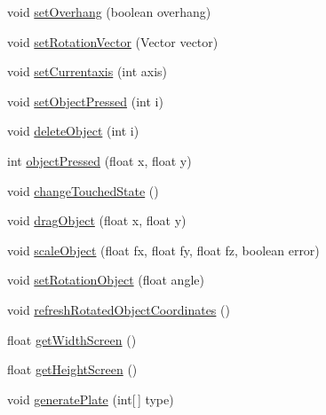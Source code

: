 \begin{DoxyCompactItemize}
void \hyperlink{classandroid_1_1app_1_1printerapp_1_1viewer_1_1_viewer_renderer_a5ac51dcece4fa2df57335da4b1ae89b6}{set\+Overhang} (boolean overhang)
\item 
void \hyperlink{classandroid_1_1app_1_1printerapp_1_1viewer_1_1_viewer_renderer_a630aca5b7a9d108174f4f1dd6afc0d84}{set\+Rotation\+Vector} (Vector vector)
\item 
void \hyperlink{classandroid_1_1app_1_1printerapp_1_1viewer_1_1_viewer_renderer_ae3c686be9606f2c225e9424736db4912}{set\+Currentaxis} (int axis)
\item 
void \hyperlink{classandroid_1_1app_1_1printerapp_1_1viewer_1_1_viewer_renderer_a92a8537b503c5ac2613d68415fca0fc1}{set\+Object\+Pressed} (int i)
\item 
void \hyperlink{classandroid_1_1app_1_1printerapp_1_1viewer_1_1_viewer_renderer_a2c22fea70b90901a3579246fc6b614a1}{delete\+Object} (int i)
\item 
int \hyperlink{classandroid_1_1app_1_1printerapp_1_1viewer_1_1_viewer_renderer_abf337945481fb0c118213fe34bce1c5b}{object\+Pressed} (float x, float y)
\item 
void \hyperlink{classandroid_1_1app_1_1printerapp_1_1viewer_1_1_viewer_renderer_a60fec6c133bbce672995771c925fb7d6}{change\+Touched\+State} ()
\item 
void \hyperlink{classandroid_1_1app_1_1printerapp_1_1viewer_1_1_viewer_renderer_a3ff5d7082c494c9c67509a4f27c10486}{drag\+Object} (float x, float y)
\item 
void \hyperlink{classandroid_1_1app_1_1printerapp_1_1viewer_1_1_viewer_renderer_adffb0db17b4ed757ce7007d436547cb9}{scale\+Object} (float fx, float fy, float fz, boolean error)
\item 
void \hyperlink{classandroid_1_1app_1_1printerapp_1_1viewer_1_1_viewer_renderer_ac323309cf851ac7474f012bf08d775d8}{set\+Rotation\+Object} (float angle)
\item 
void \hyperlink{classandroid_1_1app_1_1printerapp_1_1viewer_1_1_viewer_renderer_a4ffd3487ece07adfed6d1d3a8ea10c01}{refresh\+Rotated\+Object\+Coordinates} ()
\item 
float \hyperlink{classandroid_1_1app_1_1printerapp_1_1viewer_1_1_viewer_renderer_a7adc8177294c84251eafb272b37af1f4}{get\+Width\+Screen} ()
\item 
float \hyperlink{classandroid_1_1app_1_1printerapp_1_1viewer_1_1_viewer_renderer_ad7b18e0b4b2d5e4094e0494e27381e3b}{get\+Height\+Screen} ()
\item 
void \hyperlink{classandroid_1_1app_1_1printerapp_1_1viewer_1_1_viewer_renderer_a113938fb8289a32a5f29e847c15a36e5}{generate\+Plate} (int\mbox{[}$\,$\mbox{]} type)

\end{DoxyCompactItemize}
